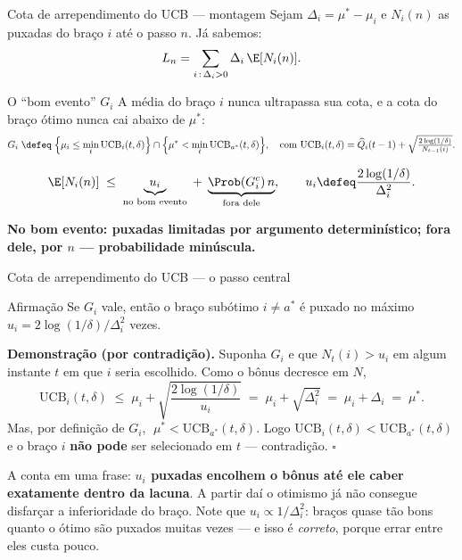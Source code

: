 \documentclass[aspectratio=169, 10pt]{beamer}
\newcommand{\Qhat}{\widehat{Q}}
\newcommand{\Nc}{N}                         %
\newcommand{\gap}{\Delta}
\newcommand{\UCB}{\mathrm{UCB}}
\newcommand{\Reg}{L}
\begin{document}
\begin{frame}{Cota de arrependimento do UCB --- montagem}
  Sejam $\gap_i = \mu^{*} - \mu_i$ e $\Nc_i(n)$ as puxadas do braço $i$ até
  o passo $n$. Já sabemos:
  \[
    \Reg_n = \sum_{i \,:\, \gap_i > 0} \gap_i \, \E[\Nc_i(n)].
  \]

  \vspace{-4mm}
  \begin{defbox}{O ``bom evento'' $G_i$}
    A média do braço $i$ nunca ultrapassa sua cota, e a cota do braço ótimo
    nunca cai abaixo de $\mu^{*}$:
    \[
      G_i \;\defeq\; \Bigl\{ \mu_i \le \min_{t} \UCB_i(t, \delta) \Bigr\}
        \cap \Bigl\{ \mu^{*} < \min_t \UCB_{a^{*}}(t, \delta) \Bigr\},
      \quad\text{com } \UCB_i(t,\delta) = \Qhat_i(t-1) + \sqrt{\tfrac{2\log(1/\delta)}{\Nc_{t-1}(i)}}.
    \]
  \end{defbox}

  \vspace{-0.4em}
  \[
    \E[\Nc_i(n)] \;\le\; \underbrace{u_i}_{\text{no bom evento}}
      \;+\; \underbrace{\Prob(G_i^{c})\, n}_{\text{fora dele}},
    \qquad u_i \defeq \frac{2\log(1/\delta)}{\gap_i^2}.
  \]
  \vspace{-0.5em}
  \vspace{-3mm}
  \begin{ideiabox}
    \textbf{No bom evento: puxadas limitadas por argumento determinístico;
    fora dele, por $n$ — probabilidade minúscula.}
  \end{ideiabox}
\end{frame}

\begin{frame}{Cota de arrependimento do UCB --- o passo central}
  \begin{teobox}{Afirmação}
    Se $G_i$ vale, então o braço subótimo $i \ne a^{*}$ é puxado no máximo
    $u_i = 2\log(1/\delta)/\gap_i^2$ vezes.
  \end{teobox}

  {\small
  \textbf{Demonstração (por contradição).} Suponha $G_i$ e que
  $\Nc_t(i) > u_i$ em algum instante $t$ em que $i$ seria escolhido. Como o
  bônus decresce em $\Nc$,
  \[
    \UCB_i(t,\delta) \;\le\; \mu_i + \sqrt{\frac{2\log(1/\delta)}{u_i}}
      \;=\; \mu_i + \sqrt{\gap_i^2}
      \;=\; \mu_i + \gap_i \;=\; \mu^{*}.
  \]
  Mas, por definição de $G_i$, $\;\mu^{*} < \UCB_{a^{*}}(t,\delta)$. Logo
  $\UCB_i(t,\delta) < \UCB_{a^{*}}(t,\delta)$ e o braço $i$
  \textbf{não pode} ser selecionado em $t$ --- contradição. \hfill $\square$
  }

  \begin{ideiabox}
    A conta em uma frase: \textbf{$u_i$ puxadas encolhem o bônus até ele
    caber exatamente dentro da lacuna}. A partir daí o otimismo já não
    consegue disfarçar a inferioridade do braço. Note que $u_i \propto
    1/\gap_i^2$: braços quase tão bons quanto o ótimo são puxados muitas
    vezes --- e isso é \emph{correto}, porque errar entre eles custa pouco.
  \end{ideiabox}
\end{frame}
\end{document}
